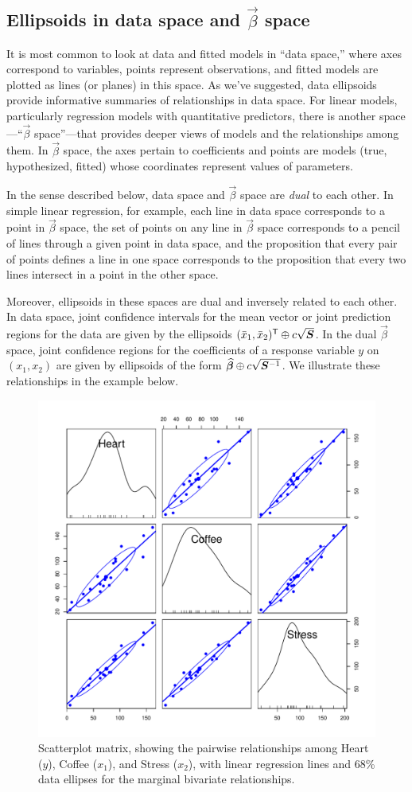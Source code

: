 \subsection[Ellipsoids in data space and beta space]{Ellipsoids in data space and $\vec{\beta}$ space}\label{sec:betaspace}

It is most common to look at data and fitted models in ``data space,'' where axes correspond to
variables, points represent observations, and fitted models are plotted as lines (or planes) in this space.
As we've suggested, data ellipsoids provide informative summaries of relationships in data space.
For linear models, particularly regression models with quantitative predictors, there is another space---``$\vec{\beta}$ space''---that provides deeper views of models and the relationships among them.
In $\vec{\beta}$ space, the axes pertain to coefficients and points are models (true, hypothesized, fitted) whose coordinates
represent values of parameters.

In the sense described below, data space and $\vec{\beta}$ space are \emph{dual} to each other.
In simple linear regression, for example, each line in data space corresponds to a point in $\vec{\beta}$ space,
the set of points on any line in $\vec{\beta}$ space corresponds to a pencil of lines through a given point
in data space, and the proposition that every pair of points defines a line in one space corresponds to
the proposition that every two lines intersect in a point in the other space.

Moreover, ellipsoids in these spaces are dual and inversely related to each other.
In data space, joint confidence intervals for the mean vector or joint prediction
regions for the data are given by the ellipsoids $(\bar{x}_1, \bar{x}_2)^\mathsf{T} \oplus c \sqrt{\bm{S}}$.
In the dual $\vec{\beta}$ space, joint confidence regions for the coefficients of 
a response variable $y$ on $(x_1, x_2)$
are given by ellipsoids of the form $\widehat{\bm{\beta}} \oplus c \sqrt{\bm{S}^{-1}}$.
We illustrate these relationships in the example below.

\begin{figure}[htb]
  \centering
  \includegraphics[width=.6\textwidth,clip]{fig/vis-reg-coffee11}
  \caption{Scatterplot matrix, showing the pairwise relationships among Heart ($y$), Coffee ($x_1$), and Stress ($x_2$),
  with linear regression lines and 68\% data ellipses for the marginal bivariate relationships.
  }%
  \label{fig:vis-reg-coffee11}
\end{figure}

